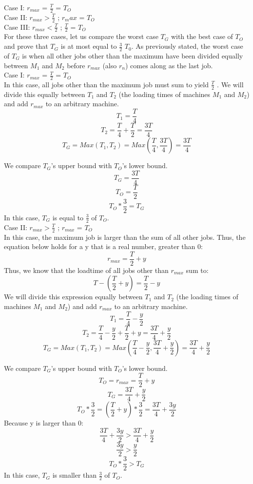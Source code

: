 \documentclass[11pt, solution, letterpaper]{format}
\begin{document}
Case I: $r_{max}$ = $\frac{T}{2}$ = $T_O$\\
Case II: $r_{max} > \frac{T}{2}$ ; $r_max$ = $T_O$\\
Case III: $r_{max} < \frac{T}{2}$ ; $\frac{T}{2}$ = $T_O$\\

For these three cases, let us compare the worst case $T_G$ with the best case of $T_O$ and prove that $T_G$ is at most equal to $\frac{3}{2}$ $T_0$. As previously stated, the worst case of $T_G$ is when all other jobs other than the maximum have been divided equally between $M_1$ and $M_2$ before $r_{max}$ (also $r_n$) comes along as the last job.\\

Case I: $r_{max}$ = $\frac{T}{2}$ = $T_O$ \\
In this case, all jobs other than the maximum job must sum to yield $\frac{T}{2}$ . We will divide this equally between $T_1$ and $T_2$ (the loading times of machines $M_1$ and $M_2$) and add $r_{max}$ to an arbitrary machine.\\
$$T_1 = \frac{T}{4}$$
$$T_2 = \frac{T}{4} + \frac{T}{2} = \frac{3T}{4}$$
$$T_G = Max(T_1, T_2) = Max(\frac{T}{4}, \frac{3T}{4}) = \frac{3T}{4}$$

We compare $T_G$'s upper bound with $T_O$'s lower bound.\\
$$T_G = \frac{3T}{4}$$
$$T_O = \frac{T}{2}$$
$$T_O * \frac{3}{2} = T_G$$
In this case, $T_G$ is equal to $\frac{3}{2}$ of $T_O$.\\

Case II: $r_{max} > \frac{T}{2}$ ; $r_{max}$ = $T_O$\\
In this case, the maximum job is larger than the sum of all other jobs. Thus, the equation below holds for a y that is a real number, greater than 0: \\
$$r_{max} = \frac{T}{2} + y$$
Thus, we know that the loadtime of all jobs other than $r_{max}$ sum to:\\
$$T - (\frac{T}{2} + y) = \frac{T}{2} - y$$
We will divide this expression equally between $T_1$ and $T_2$ (the loading times of machines $M_1$ and $M_2$) and add $r_{max}$ to an arbitrary machine.\\
$$T_1 = \frac{T}{4} - \frac{y}{2}$$
$$T_2 = \frac{T}{4} - \frac{y}{2} + \frac{T}{2} + y = \frac{3T}{4} + \frac{y}{2}$$
$$T_G = Max(T_1, T_2) = Max(\frac{T}{4} - \frac{y}{2}, \frac{3T}{4} + \frac{y}{2}) = \frac{3T}{4} + \frac{y}{2}$$

We compare $T_G$'s upper bound with $T_O$'s lower bound.\\
$$T_O = r_{max} = \frac{T}{2} + y$$
$$T_G = \frac{3T}{4} + \frac{y}{2}$$
$$ T_O * \frac{3}{2} = (\frac{T}{2} + y) * \frac{3}{2} = \frac{3T}{4} + \frac{3y}{2}$$
Because y is larger than 0:
$$ \frac{3T}{4} + \frac{3y}{2} > \frac{3T}{4} + \frac{y}{2}$$
$$ \frac{3y}{2} > \frac{y}{2}$$
$$T_O * \frac{3}{2} > T_G$$
In this case, $T_G$ is smaller than $\frac{3}{2}$ of $T_O$.\\
\end{document}
